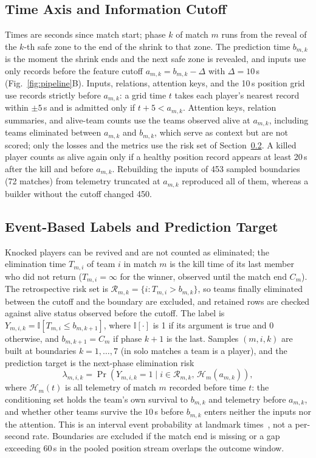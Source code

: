 \documentclass[sigconf,anonymous]{acmart}
\begin{document}
\subsection{Time Axis and Information Cutoff}
\label{sec:method:samples}
Times are seconds since match start; phase $k$ of match $m$ runs from the reveal of the $k$-th safe zone to the end of the shrink to that zone. The prediction time $b_{m,k}$ is the moment the shrink ends and the next safe zone is revealed, and inputs use only records before the feature cutoff $a_{m,k}=b_{m,k}-\Delta$ with $\Delta=10$\,s (Fig.~\ref{fig:pipeline}B). Inputs, relations, attention keys, and the 10\,s position grid use records strictly before $a_{m,k}$: a grid time $t$ takes each player's nearest record within $\pm5$\,s and is admitted only if $t+5<a_{m,k}$. Attention keys, relation summaries, and alive-team counts use the teams observed alive at $a_{m,k}$, including teams eliminated between $a_{m,k}$ and $b_{m,k}$, which serve as context but are not scored; only the losses and the metrics use the risk set of Section~\ref{sec:method:labels}. A killed player counts as alive again only if a healthy position record appears at least 20\,s after the kill and before $a_{m,k}$. Rebuilding the inputs of 453 sampled boundaries (72 matches) from telemetry truncated at $a_{m,k}$ reproduced all of them, whereas a builder without the cutoff changed 450.

\subsection{Event-Based Labels and Prediction Target}
\label{sec:method:labels}
Knocked players can be revived and are not counted as eliminated; the elimination time $T_{m,i}$ of team $i$ in match $m$ is the kill time of its last member who did not return ($T_{m,i}=\infty$ for the winner, observed until the match end $C_m$). The retrospective risk set is $\mathcal{R}_{m,k}=\{i:T_{m,i}>b_{m,k}\}$, so teams finally eliminated between the cutoff and the boundary are excluded, and retained rows are checked against alive status observed before the cutoff. The label is $Y_{m,i,k}=\mathbb{I}[T_{m,i}\le b_{m,k+1}]$, where $\mathbb{I}[\cdot]$ is 1 if its argument is true and 0 otherwise, and $b_{m,k+1}=C_m$ if phase $k+1$ is the last. Samples $(m,i,k)$ are built at boundaries $k=1,\dots,7$ (in solo matches a team is a player), and the prediction target is the next-phase elimination risk
\begin{equation}
\lambda_{m,i,k}=\Pr\!\left(Y_{m,i,k}=1 \mid i\in\mathcal{R}_{m,k},\,\mathcal{H}_{m}(a_{m,k})\right),
\label{eq:hazard}
\end{equation}
where $\mathcal{H}_{m}(t)$ is all telemetry of match $m$ recorded before time $t$: the conditioning set holds the team's own survival to $b_{m,k}$ and telemetry before $a_{m,k}$, and whether other teams survive the $10$\,s before $b_{m,k}$ enters neither the inputs nor the attention. This is an interval event probability at landmark times~\cite{vanHouwelingen07}, not a per-second rate. Boundaries are excluded if the match end is missing or a gap exceeding 60\,s in the pooled position stream overlaps the outcome window.
\end{document}
